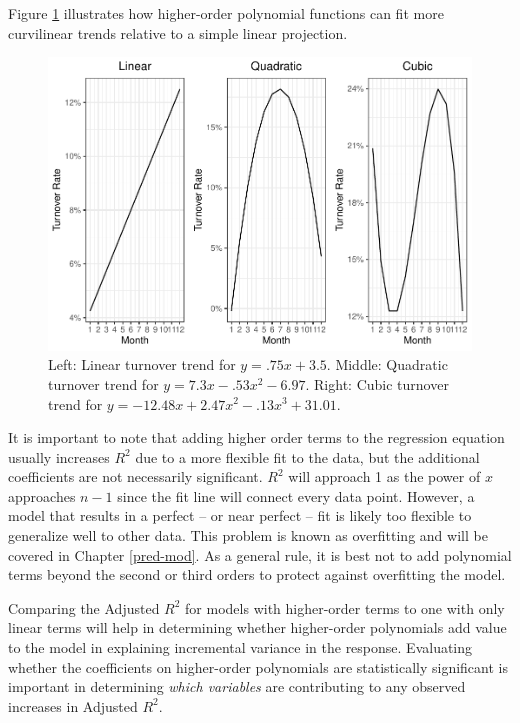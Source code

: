 \documentclass[
]{book}
\begin{document}
Figure \ref{fig:poly-fun} illustrates how higher-order polynomial functions can fit more curvilinear trends relative to a simple linear projection.

\begin{figure}

{\centering \includegraphics[width=1\linewidth]{People_Analytics_Lifecycle_files/figure-latex/poly-fun-1} 

}

\caption{Left: Linear turnover trend for $y = .75x + 3.5$. Middle: Quadratic turnover trend for $y = 7.3x - .53x^2 - 6.97$. Right: Cubic turnover trend for $y = -12.48x + 2.47x^2 - .13x^3 + 31.01$.}\label{fig:poly-fun}
\end{figure}

It is important to note that adding higher order terms to the regression equation usually increases \(R^2\) due to a more flexible fit to the data, but the additional coefficients are not necessarily significant. \(R^2\) will approach 1 as the power of \(x\) approaches \(n-1\) since the fit line will connect every data point. However, a model that results in a perfect -- or near perfect -- fit is likely too flexible to generalize well to other data. This problem is known as overfitting and will be covered in Chapter \ref{pred-mod}. As a general rule, it is best not to add polynomial terms beyond the second or third orders to protect against overfitting the model.

Comparing the Adjusted \(R^2\) for models with higher-order terms to one with only linear terms will help in determining whether higher-order polynomials add value to the model in explaining incremental variance in the response. Evaluating whether the coefficients on higher-order polynomials are statistically significant is important in determining \emph{which variables} are contributing to any observed increases in Adjusted \(R^2\).
\end{document}
